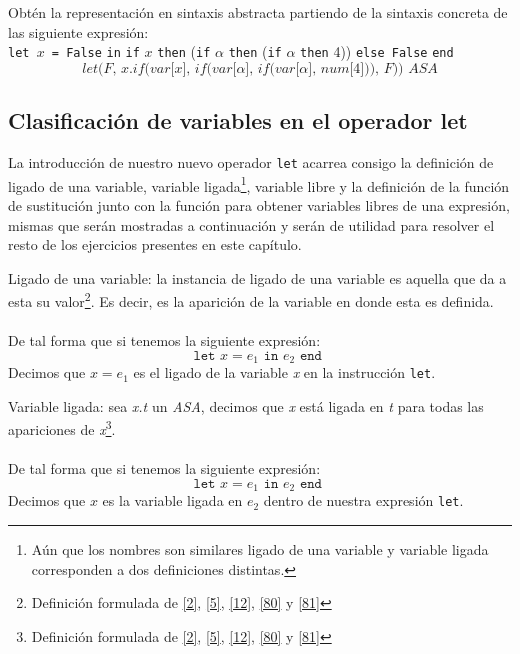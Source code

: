     \begin{exercise}
        Obtén la representación en sintaxis abstracta partiendo de la sintaxis concreta de las siguiente expresión: \\
        
        \texttt{let $x$ = False} \texttt{in} \texttt{if} $x$ \texttt{then} (\texttt{if} $\alpha$ \texttt{then} (\texttt{if} $\alpha$ \texttt{then} 4)) \texttt{else False} \texttt{end}\\
        \[
            \textit{let(F, x.if(var[x], if(var[$\alpha$], if(var[$\alpha$], num[4])), F)) ASA}
        \]        
    \end{exercise}

    \bigskip

    \subsection{Clasificación de variables en el operador let}
    
    La introducción de nuestro nuevo operador \texttt{let} acarrea consigo la definición de ligado de una variable, variable ligada\footnote{Aún que los nombres son similares ligado de una variable y variable ligada corresponden a dos definiciones distintas.}, variable libre y la definición de la función de sustitución junto con la función para obtener variables libres de una expresión, mismas que serán mostradas a continuación y serán de utilidad para resolver el resto de los ejercicios presentes en este capítulo.\\
    
    \begin{definition}Ligado de una variable: la instancia de ligado de una variable es aquella que da a esta su valor\footnote{Definición formulada de \hyperlink{2}{[2]}, \hyperlink{5}{[5]}, \hyperlink{12}{[12]}, \hyperlink{80}{[80]} y \hyperlink{81}{[81]}}. Es decir, es la aparición de la variable en donde esta es definida. \\\\
    De tal forma que si tenemos la siguiente expresión: \[ \texttt{let } x = e_1 \texttt{ in } e_2 \texttt{ end } \] Decimos que $x = e_1$ es el ligado de la variable \textit{x} en la instrucción \texttt{let}.
    \end{definition}

    \bigskip

    \begin{definition}Variable ligada: sea \textit{x.t} un \textit{ASA}, decimos que \textit{x} está ligada en \textit{t} para todas las apariciones de \textit{x}\footnote{Definición formulada de \hyperlink{2}{[2]}, \hyperlink{5}{[5]}, \hyperlink{12}{[12]}, \hyperlink{80}{[80]} y \hyperlink{81}{[81]}}.\\\\
    De tal forma que si tenemos la siguiente expresión: \[ \texttt{let } x = e_1 \texttt{ in } e_2 \texttt{ end } \] Decimos que $x $ es la variable ligada en $e_2$ dentro de nuestra expresión \texttt{let}.
    \end{definition}

